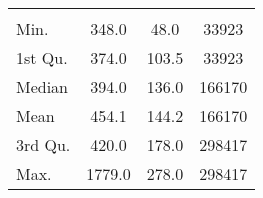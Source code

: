 \begin{tabular}{lS[table-format=5.1]S[table-format=5.1]S[table-format=5.1]}
&  &  &  \\
 Min.    & 348.0 & 48.0 & 33923 \\
 1st Qu. & 374.0 & 103.5 & 33923 \\
 Median  & 394.0 & 136.0 & 166170 \\
 Mean    & 454.1 & 144.2 & 166170 \\
 3rd Qu. & 420.0 & 178.0 & 298417 \\
 Max.    & 1779.0 & 278.0 & 298417 \\
\end{tabular}
